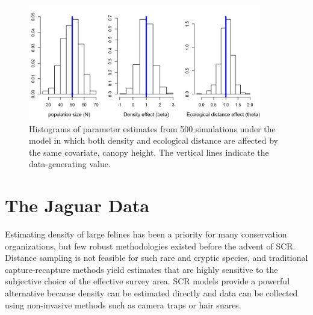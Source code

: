 \begin{figure}[ht]
\centering
\includegraphics[width=4in,height=2in]{Ch11-Statespace/figs/scrDEDsim}
\caption{Histograms of parameter estimates from 500 simulations under
  the model in which both density and ecological distance are affected
by the same covariate, canopy height. The vertical lines indicate the
data-generating value.}
\label{ch9.fig.sim}
\end{figure}


\section{The Jaguar Data}

Estimating density of large felines has been a priority for many
conservation organizations, but few robust methodologies existed before
the advent of SCR. Distance sampling is not feasible for such rare and
cryptic species, and traditional capture-recapture methods yield
estimates that are highly sensitive to the subjective choice of the
effective survey area. SCR models provide a powerful alternative
because density can be estimated directly and data can be collected
using non-invasive methods such as camera traps or hair snares.

